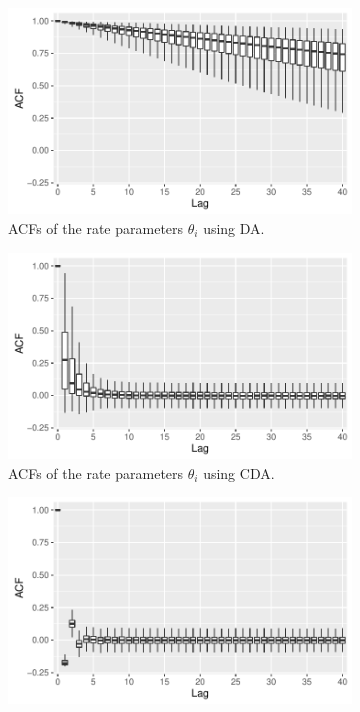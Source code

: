 \documentclass[10pt]{article}
\begin{document}
 \begin{figure}[H]
   \begin{subfigure}[b]{0.32\textwidth}
 \includegraphics[width=1\textwidth]{binomial_random_acf_da.pdf}
 \caption{ACFs of the rate parameters $\theta_i$ using DA.}
 \end{subfigure}
  \hfill 
 \begin{subfigure}[b]{0.32\textwidth}
 \includegraphics[width=1\textwidth]{binomial_random_acf_cda.pdf}
 \caption{ACFs of the rate parameters $\theta_i$ using CDA.}
 \end{subfigure} 
   \hfill 
 \begin{subfigure}[b]{0.32\textwidth}
 \includegraphics[width=1\textwidth]{binomial_random_acf_hmc.pdf}

\end{subfigure}
\end{figure}
\end{document}
